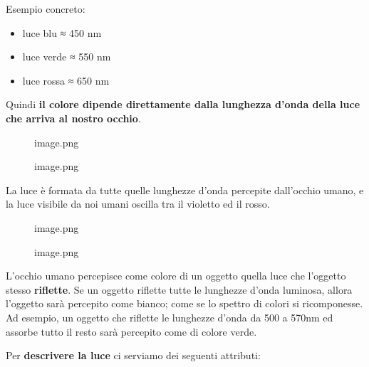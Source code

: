 \documentclass[
]{article}
\providecommand{\tightlist}{%
  \setlength{\itemsep}{0pt}\setlength{\parskip}{0pt}}
\begin{document}
Esempio concreto:

\begin{itemize}
\tightlist
\item
  luce blu ≈ 450 nm
\item
  luce verde ≈ 550 nm
\item
  luce rossa ≈ 650 nm
\end{itemize}

Quindi \textbf{il colore dipende direttamente dalla lunghezza d'onda della luce che arriva al nostro occhio}.

\begin{figure}
\centering
{image.png}
\caption{image.png}
\end{figure}

La luce è formata da tutte quelle lunghezze d'onda percepite dall'occhio umano, e la luce visibile da noi umani oscilla tra il violetto ed il rosso.

\begin{figure}
\centering
{image.png}
\caption{image.png}
\end{figure}

L'occhio umano percepisce come colore di un oggetto quella luce che l'oggetto stesso \textbf{riflette}. Se un oggetto riflette tutte le lunghezze d'onda luminosa, allora l'oggetto sarà percepito come bianco; come se lo spettro di colori si ricomponesse.
Ad esempio, un oggetto che riflette le lunghezze d'onda da 500 a 570nm ed assorbe tutto il resto sarà percepito come di colore verde.

Per \textbf{descrivere la luce} ci serviamo dei seguenti attributi:
\end{document}
